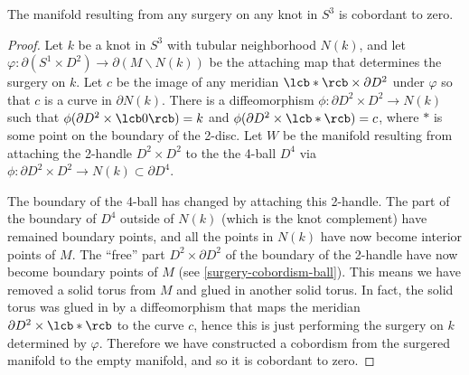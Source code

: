 \begin{prop}
\label{surgery attaching 2-handle proposition}
The manifold resulting from any surgery on any knot in $S^3$ is cobordant to zero.
\end{prop}
\begin{proof}
Let $k$ be a knot in $S^3$ with tubular neighborhood $N(k)$, and let $\varphi : \partial(S^1 \times D^2) \rightarrow \partial(M \backslash N(k))$ be the attaching map that determines the surgery on $k$. Let $c$ be the image of any meridian $\lcb * \rcb \times \partial D^2$ under $\varphi$ so that $c$ is a curve in $\partial N(k)$. There is a diffeomorphism $\phi : \partial D^2 \times D^2 \rightarrow N(k)$ such that $\phi(\partial D^2 \times \lcb 0 \rcb) = k$ and $\phi(\partial D^2 \times \lcb * \rcb) = c$, where $*$ is some point on the boundary of the 2-disc. Let $W$ be the manifold resulting from attaching the 2-handle $D^2 \times D^2$ to the the 4-ball $D^4$ via $\phi : \partial D^2 \times D^2 \rightarrow N(k) \subset \partial D^4$.

The boundary of the 4-ball has changed by attaching this 2-handle. The part of the boundary of $D^4$ outside of $N(k)$ (which is the knot complement) have remained boundary points, and all the points in $N(k)$ have now become interior points of $M$. The ``free'' part $D^2 \times \partial D^2$ of the boundary of the 2-handle have now become boundary points of $M$ (see \cref{surgery-cobordism-ball}). This means we have removed a solid torus from $M$ and glued in another solid torus. In fact, the solid torus was glued in by a diffeomorphism that maps the meridian $\partial D^2 \times \lcb * \rcb$ to the curve $c$, hence this is just performing the surgery on $k$ determined by $\varphi$. Therefore we have constructed a cobordism from the surgered manifold to the empty manifold, and so it is cobordant to zero. 


\end{proof}
